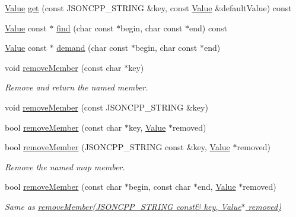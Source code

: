 \begin{DoxyCompactItemize}
\item 
\hyperlink{classJson_1_1Value}{Value} \hyperlink{classJson_1_1Value_a7406e6af727c288bf8ab59945ece686a}{get} (const J\+S\+O\+N\+C\+P\+P\+\_\+\+S\+T\+R\+I\+NG \&key, const \hyperlink{classJson_1_1Value}{Value} \&default\+Value) const
\item 
\hyperlink{classJson_1_1Value}{Value} const  $\ast$ \hyperlink{classJson_1_1Value_afb007b9ce9b2cf9d5f667a07e5e0349f}{find} (char const $\ast$begin, char const $\ast$end) const
\item 
\hyperlink{classJson_1_1Value}{Value} const  $\ast$ \hyperlink{classJson_1_1Value_afeb7ff596a0929d90c5f2f3cffb413ed}{demand} (char const $\ast$begin, char const $\ast$end)
\item 
void \hyperlink{classJson_1_1Value_a92e165f04105d27a930fb3a18a053585}{remove\+Member} (const char $\ast$key)
\begin{DoxyCompactList}\small\item\em Remove and return the named member. \end{DoxyCompactList}\item 
void \hyperlink{classJson_1_1Value_a8a660202bbad35857b39e85bd35ec78a}{remove\+Member} (const J\+S\+O\+N\+C\+P\+P\+\_\+\+S\+T\+R\+I\+NG \&key)
\item 
bool \hyperlink{classJson_1_1Value_a708e599489adf30d65bf85a8ee16e6fb}{remove\+Member} (const char $\ast$key, \hyperlink{classJson_1_1Value}{Value} $\ast$removed)
\item 
bool \hyperlink{classJson_1_1Value_ae385ecef98427970df525ee876e9f54a}{remove\+Member} (J\+S\+O\+N\+C\+P\+P\+\_\+\+S\+T\+R\+I\+NG const \&key, \hyperlink{classJson_1_1Value}{Value} $\ast$removed)
\begin{DoxyCompactList}\small\item\em Remove the named map member. \end{DoxyCompactList}\item 
\mbox{\label{classJson_1_1Value_a49c91af727d6b4eb0af02a81bb2def87}} 
bool \hyperlink{classJson_1_1Value_a49c91af727d6b4eb0af02a81bb2def87}{remove\+Member} (const char $\ast$begin, const char $\ast$end, \hyperlink{classJson_1_1Value}{Value} $\ast$removed)
\begin{DoxyCompactList}\small\item\em Same as \hyperlink{classJson_1_1Value_ae385ecef98427970df525ee876e9f54a}{remove\+Member(\+J\+S\+O\+N\+C\+P\+P\+\_\+\+S\+T\+R\+I\+N\+G const\& key, Value$\ast$ removed)} \end{DoxyCompactList}\item 

\end{DoxyCompactItemize}
